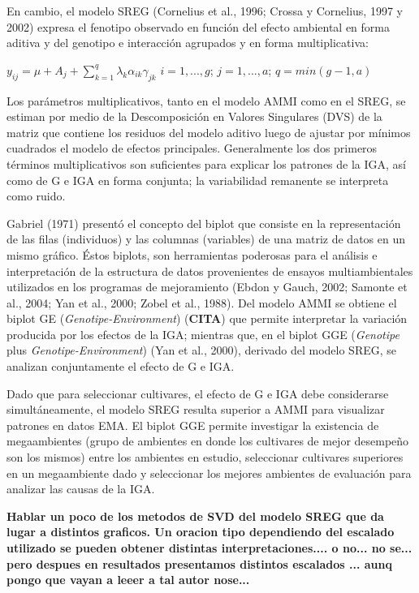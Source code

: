 En cambio, el modelo SREG (Cornelius et al., 1996; Crossa y Cornelius, 1997 y 2002) expresa el fenotipo observado en función del efecto ambiental en forma aditiva y del genotipo e interacción agrupados y en forma multiplicativa:
\begin{center}
$y_{ij}= \mu +  A_j + \sum_{k=1}^q \lambda_k \alpha_{ik} \gamma_{jk}$ \hspace{0.5cm} $ i=1,...,g$;\hspace{0.15cm} $ j=1,...,a$; \hspace{0.15cm} $q=min(g-1,a)$
\end{center} 

Los parámetros multiplicativos, tanto en el modelo AMMI como en el SREG, se estiman por medio de la Descomposición en Valores Singulares (DVS) de la matriz que contiene los residuos del modelo aditivo luego de ajustar por mínimos cuadrados el modelo de efectos principales. Generalmente los dos primeros términos multiplicativos son suficientes para explicar los patrones de la IGA, así como de G e IGA en forma conjunta; la variabilidad remanente se interpreta como ruido. 
 
 Gabriel (1971) presentó el concepto del biplot que consiste en la representación de las filas (individuos) y las columnas (variables) de una matriz de datos en un mismo gráfico. Éstos biplots, son herramientas poderosas para el análisis e interpretación de la estructura de datos provenientes de ensayos multiambientales utilizados en los programas de mejoramiento (Ebdon y Gauch, 2002; Samonte et al., 2004; Yan et al., 2000; Zobel et al., 1988). Del modelo AMMI se obtiene el biplot GE (\emph{Genotipe-Environment}) (\textbf{CITA})  que permite interpretar la variación producida por los efectos de la IGA; mientras que, en el biplot GGE (\emph{Genotipe} plus \emph{Genotipe-Environment}) (Yan et al., 2000), derivado del modelo SREG, se analizan conjuntamente el efecto de G e IGA.

Dado que para seleccionar cultivares, el efecto de G e IGA debe considerarse simultáneamente, el modelo SREG resulta superior a AMMI para visualizar patrones en datos EMA. El biplot GGE permite investigar la existencia de megaambientes (grupo de ambientes en donde los cultivares de mejor desempeño son los mismos) entre los ambientes en estudio, seleccionar cultivares superiores en un megaambiente dado y seleccionar los mejores ambientes de evaluación para analizar las causas de la IGA.

\textbf{Hablar un poco de los metodos de SVD del modelo SREG que da lugar a distintos graficos. Un oracion tipo dependiendo del escalado utilizado se pueden obtener distintas interpretaciones.... o no... no se... pero despues en resultados presentamos distintos escalados ... aunq pongo que vayan a leeer a tal autor nose... }

